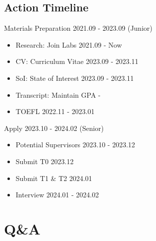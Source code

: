 \documentclass[UTF8]{beamer}
\begin{document}
\subsection{Action Timeline}
\begin{frame}{Materials Preparation \hfill 2021.09 - 2023.09 \tiny{(Junior)}}
  \begin{itemize}
    \item Research: Join Labs \hfill 2021.09 - Now
    \item CV: Curriculum Vitae \hfill 2023.09 - 2023.11
    \item SoI: State of Interest \hfill 2023.09 - 2023.11
    \item Transcript: Maintain GPA \hfill -
    \item TOEFL   \hfill 2022.11 - 2023.01
  \end{itemize}
\end{frame}

\begin{frame}{Apply \hfill 2023.10 - 2024.02 \tiny{(Senior)}}
  \begin{itemize}
    \item Potential Supervisors \hfill 2023.10 - 2023.12
    \item Submit T0 \hfill 2023.12
    \item Submit T1 \& T2  \hfill 2024.01
    \item Interview \hfill 2024.01 - 2024.02
  \end{itemize}
\end{frame}

\section{Q\&A}
\end{document}
